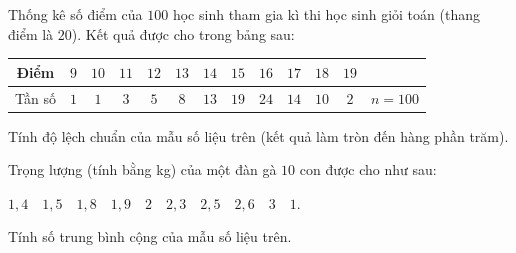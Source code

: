 \begin{bt}%
Thống kê số điểm của $100$ học sinh tham gia kì thi học sinh giỏi toán (thang điểm là $20$). Kết quả được cho trong bảng sau:
\begin{center}
	\begin{tabular}{|c|c|c|c|c|c|c|c|c|c|c|c|c|}
		\hline 
		Điểm & $9$ & $10$ & $11$ & $12$ & $13$ & $14$ & $15$ & $16$ & $17$ & $18$ & $19$& \\ 
		\hline 
		Tần số & $1$ & $1$ & $3$ & $5$ & $8$ & $13$ & $19$ & $24$ & $14$ & $10$ & $2$ & $n=100$\\ 
		\hline 
	\end{tabular} 
\end{center}
 Tính độ lệch chuẩn của mẫu số liệu trên (kết quả làm tròn đến hàng phần trăm).
 
\end{bt}

\begin{bt}%
	Trọng lượng (tính bằng kg) của một đàn gà $ 10 $ con được cho như sau:
	\begin{center}
		$ 1{,}4 \quad 1{,}5 \quad 1{,}8 \quad 1{,}9 \quad 2 \quad 2{,}3 \quad 2{,}5 \quad 2{,}6 \quad 3 \quad 1 $.
	\end{center}
	Tính số trung bình cộng của mẫu số liệu trên.
	
\end{bt}

